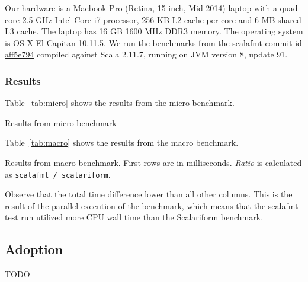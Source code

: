 Our hardware is a Macbook Pro (Retina, 15-inch, Mid 2014) laptop with a quad-core 2.5 GHz Intel Core i7 processor, 256 KB L2 cache per core and 6 MB shared L3 cache.
The laptop has 16 GB 1600 MHz DDR3 memory.
The operating system is OS X El Capitan 10.11.5.
We run the benchmarks from the scalafmt commit id \href{https://github.com/olafurpg/scalafmt/tree/aff5e794dae4787b08243f8abb87a3ca4d907e40}{aff5e794} compiled against Scala 2.11.7, running on JVM version 8, update 91.

\subsubsection{Results}
Table~\ref{tab:micro} shows the results from the micro benchmark.
\begin{table}\label{tab:micro}
  \centering
  \caption{Results from micro benchmark}
\end{table}

Table~\ref{tab:macro} shows the results from the macro benchmark.
\begin{table}
  \centering
  
  \caption{Results from macro benchmark. First rows are in milliseconds. \emph{Ratio} is calculated as  \texttt{scalafmt / scalariform}.}\label{tab:macro}
\end{table}
Observe that the total time difference lower than all other columns.
This is the result of the parallel execution of the benchmark, which means that the scalafmt test run utilized more CPU wall time than the Scalariform benchmark.



\subsection{Adoption}\label{sec:adoption}
TODO



